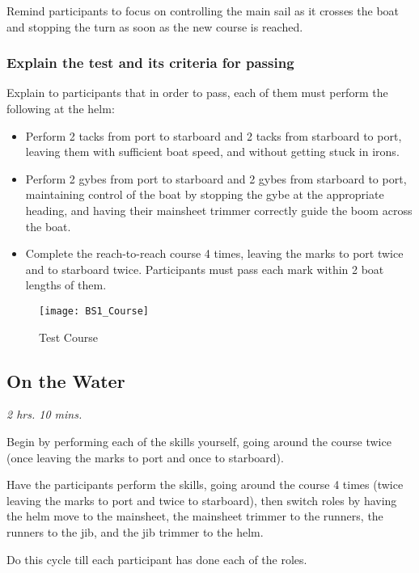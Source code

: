 \documentclass[12pt]{scrartcl}
\begin{document}
Remind participants to focus on controlling the main sail as it crosses the boat and stopping the turn as soon as the new course is reached.

\subsubsection{Explain the test and its criteria for passing} \label{subsubsec:test}

Explain to participants that in order to pass, each of them must perform the following at the helm:

\begin{itemize}
	\item Perform 2 tacks from port to starboard and 2 tacks from starboard to port, leaving them with sufficient boat speed, and without getting stuck in irons.
	\item Perform 2 gybes from port to starboard and 2 gybes from starboard to port, maintaining control of the boat by stopping the gybe at the appropriate heading, and having their mainsheet trimmer correctly guide the boom across the boat.
	\item Complete the reach-to-reach course 4 times, leaving the marks to port twice and to starboard twice. Participants must pass each mark within 2 boat lengths of them.
\end{itemize}

\label{fig:test course}
\begin{figure}[H]
	\centering
	\texttt{[image: BS1\_Course]}
	\caption{Test Course}
\end{figure}

\subsection{On the Water} \label{subsec:on the water}

{\small \textit{2 hrs. 10 mins.}}

Begin by performing each of the skills yourself, going around the course twice (once leaving the marks to port and once to starboard).

Have the participants perform the skills, going around the course 4 times (twice leaving the marks to port and twice to starboard), then switch roles by having the helm move to the mainsheet, the mainsheet trimmer to the runners, the runners to the jib, and the jib trimmer to the helm.

Do this cycle till each participant has done each of the roles.
\end{document}
